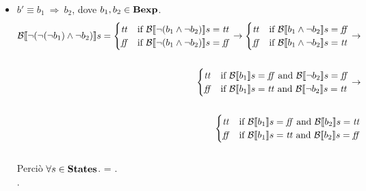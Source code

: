 {\begin{enumerate}[label=(\alph*)]
\begin{itemize}
    \item $ b' \equiv b_1 \ \Rightarrow \ b_2$, dove $b_1, b_2 \in \mbox{\textbf{Bexp}}$. \\
    \begin{align*}
      \mathcal{B} \llbracket \lnot( \lnot( \lnot b_1) \land \lnot b_2) \rrbracket s =
      \begin{cases}
      \mbox{\textit{tt}} &
      \mbox{if} \ \mathcal{B} \llbracket \lnot(b_1 \land \lnot b_2) \rrbracket s = \mbox{\textit{tt}} \\
      \mbox{\textit{ff}} &
      \mbox{if} \  \mathcal{B} \llbracket \lnot(b_1 \land \lnot b_2) \rrbracket s = \mbox{\textit{ff}} \\
      \end{cases}
      \rightarrow
      \begin{cases}
      \mbox{\textit{tt}} &
      \mbox{if} \ \mathcal{B} \llbracket b_1 \land \lnot b_2 \rrbracket s = \mbox{\textit{ff}} \\
      \mbox{\textit{ff}} &
      \mbox{if} \ \mathcal{B} \llbracket b_1 \land \lnot b_2 \rrbracket s = \mbox{\textit{tt}} \\
      \end{cases}
      \rightarrow \\ \\
      \begin{cases}
      \mbox{\textit{tt}} &
      \mbox{if} \ \mathcal{B} \llbracket b_1 \rrbracket s = \mbox{\textit{ff}}
                  \mbox{ and }
                  \mathcal{B} \llbracket \lnot b_2 \rrbracket s = \mbox{\textit{ff}} \\
      \mbox{\textit{ff}} &
      \mbox{if} \ \mathcal{B} \llbracket b_1 \rrbracket s = \mbox{\textit{tt}}
                  \mbox{ and }
                  \mathcal{B} \llbracket \lnot b_2 \rrbracket s = \mbox{\textit{tt}} \\
      \end{cases}
      \rightarrow \\ \\
      \begin{cases}
      \mbox{\textit{tt}} &
      \mbox{if} \ \mathcal{B} \llbracket b_1 \rrbracket s = \mbox{\textit{ff}}
                  \mbox{ and }
                  \mathcal{B} \llbracket b_2 \rrbracket s = \mbox{\textit{tt}} \\
      \mbox{\textit{ff}} &
      \mbox{if} \ \mathcal{B} \llbracket b_1 \rrbracket s = \mbox{\textit{tt}}
                  \mbox{ and }
                  \mathcal{B} \llbracket b_2 \rrbracket s = \mbox{\textit{ff}} \\
      \end{cases}
    \end{align*} \\
      Perciò $\forall s \in \mbox{\textbf{States}}$. =
       . \\.
    

\end{itemize}
\end{enumerate}}
